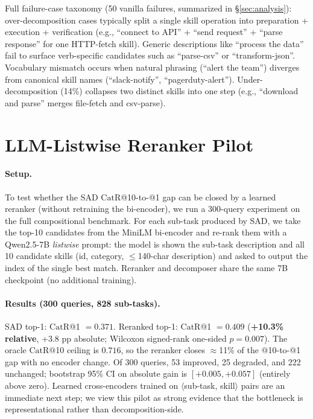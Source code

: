 \documentclass[11pt]{article}
\newcommand{\catrecall}{\text{CatR}}
\begin{document}
Full failure-case taxonomy (50 vanilla failures, summarized in \S\ref{sec:analysis}): over-decomposition cases typically split a single skill operation into preparation + execution + verification (e.g., ``connect to API'' + ``send request'' + ``parse response'' for one HTTP-fetch skill). Generic descriptions like ``process the data'' fail to surface verb-specific candidates such as ``parse-csv'' or ``transform-json''. Vocabulary mismatch occurs when natural phrasing (``alert the team'') diverges from canonical skill names (``slack-notify'', ``pagerduty-alert'').
Under-decomposition (14\%) collapses two distinct skills into one step (e.g., ``download and parse'' merges file-fetch and csv-parse).

\section{LLM-Listwise Reranker Pilot}
\label{app:rerank}

\paragraph{Setup.}
To test whether the SAD $\catrecall$@10-to-@1 gap can be closed by a learned reranker (without retraining the bi-encoder), we run a 300-query experiment on the full compositional benchmark.
For each sub-task produced by SAD, we take the top-10 candidates from the MiniLM bi-encoder and re-rank them with a Qwen2.5-7B \emph{listwise} prompt: the model is shown the sub-task description and all 10 candidate skills (id, category, $\le$140-char description) and asked to output the index of the single best match.
Reranker and decomposer share the same 7B checkpoint (no additional training).

\paragraph{Results (300 queries, 828 sub-tasks).}
SAD top-1: $\catrecall$@1 $= 0.371$.
Reranked top-1: $\catrecall$@1 $= 0.409$ (\textbf{+10.3\% relative}, +3.8 pp absolute; Wilcoxon signed-rank one-sided $p{=}0.007$).
The oracle $\catrecall$@10 ceiling is $0.716$, so the reranker closes $\approx$11\% of the @10-to-@1 gap with no encoder change.
Of 300 queries, 53 improved, 25 degraded, and 222 unchanged; bootstrap 95\% CI on absolute gain is $[+0.005, +0.057]$ (entirely above zero).
Learned cross-encoders trained on $\langle$sub-task, skill$\rangle$ pairs are an immediate next step; we view this pilot as strong evidence that the bottleneck is representational rather than decomposition-side.
\end{document}
